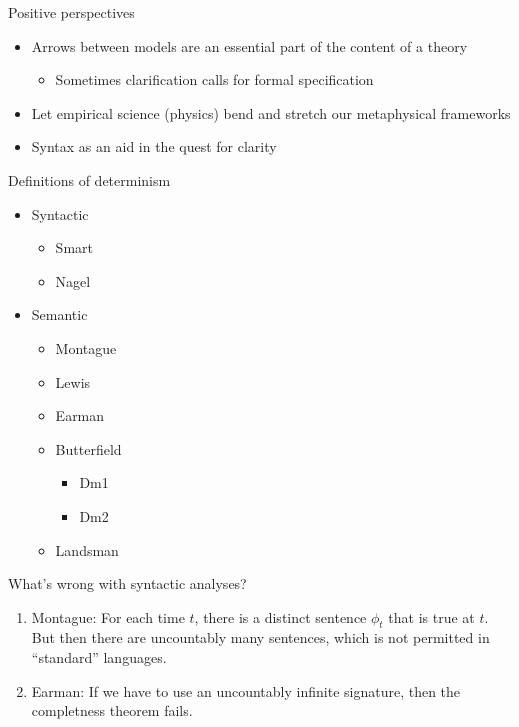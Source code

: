 \documentclass[fleqn]{beamer}
\begin{document}
\begin{frame}{Positive perspectives}

  \begin{itemize}
  \item Arrows between models are an essential part of the content of
    a theory
    \begin{itemize}
    \item Sometimes clarification calls for formal specification
    \end{itemize}
  \item Let empirical science (physics) bend and stretch our
    metaphysical frameworks
  \item Syntax as an aid in the quest for clarity
  \end{itemize}
  
\end{frame}


\begin{frame}{Definitions of determinism}

  \begin{itemize}
  \item Syntactic
    \begin{itemize}
    \item Smart
    \item Nagel
    \end{itemize}
  \item Semantic
    \begin{itemize}
    \item Montague  
    \item Lewis
    \item Earman
    \item Butterfield
      \begin{itemize}
      \item Dm1
      \item Dm2
      \end{itemize}
    \item Landsman
    \end{itemize}
  \end{itemize}

\end{frame}


\begin{frame}{What's wrong with syntactic analyses?}

  \begin{enumerate}
  \item Montague: For each time $t$, there is a distinct sentence
    $\phi _t$ that is true at $t$. But then there are uncountably many
    sentences, which is not permitted in ``standard'' languages.
  \item Earman: If we have to use an uncountably infinite signature,
    then the completness theorem fails.
  \end{enumerate}


\end{frame}
\end{document}
